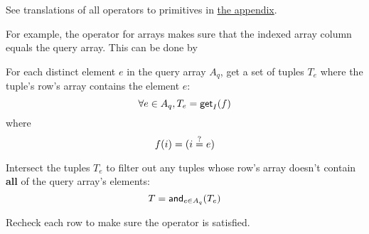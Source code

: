 See translations of all operators to primitives in \protect\hyperlink{%
  operators-to-primitives}{%
  the appendix}.

For example, the \sqlinline{=} operator for arrays makes sure that the indexed
array column equals the query array. This can be done by

\begin{nparts}
\item
  For each distinct element $e$ in the query array $A_q$, get a set of tuples
  $T_e$ where the tuple's row's array contains the element $e$:
  \[
    \forall e \in A_q, T_e = \mathsf{get}_I(f)
  \]
  where
  \[
    f(i) = \lparen i \overset{?}{=} e\rparen
  \]
\item
  Intersect the tuples $T_e$ to filter out any tuples whose row's array doesn't
  contain \textbf{all} of the query array's elements:
  \[
    T = \mathsf{and}_{e \in A_q}(T_e)
  \]
\item
  Recheck each row to make sure the \sqlinline{=} operator is satisfied.
\end{nparts}

